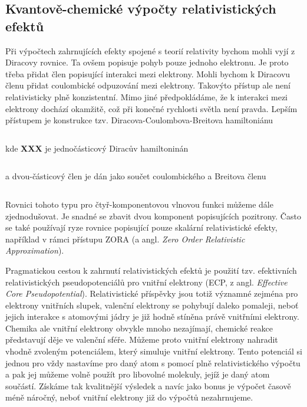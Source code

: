 \subsection{Kvantově-chemické výpočty relativistických efektů}

Při výpočtech zahrnujících efekty spojené s teorií relativity bychom mohli vyjí z Diracovy rovnice. Ta ovšem popisuje pohyb pouze jednoho elektronu. Je proto třeba přidat člen popisující interakci mezi elektrony. Mohli bychom k Diracovu členu přidat coulombické odpuzování mezi elektrony. Takovýto přístup ale není relativisticky plně konzistentní. Mimo jiné předpokládáme, že k interakci mezi elektrony dochází okamžitě, což při konečné rychlosti světla není pravda. Lepším přístupem je konstrukce tzv. Diracova-Coulombova-Breitova hamiltoniánu

\begin{equation}
\label{rov:XXX}
\end{equation}

\noindent kde \textbf{XXX} je jednočásticový Diracův hamiltoninán

\begin{equation}
\label{rov:XXX}
\end{equation}


\noindent a dvou-částicový člen je dán jako součet coulombického a Breitova členu


\begin{equation}
\label{rov:XXX}
\end{equation}

Rovnici tohoto typu pro čtyř-komponentovou vlnovou funkci můžeme dále zjednodušovat. Je snadné se zbavit dvou komponent popisujících pozitrony. Často se také používají ryze rovnice popisující pouze skalární relativistické efekty, například v rámci přístupu ZORA (a angl. \textit{Zero Order Relativistic Approximation}).

Pragmatickou cestou k zahrnutí relativistických efektů je použití tzv. efektivních relativistických pseudopotenciálů pro vnitřní elektrony (ECP, z angl. \textit{Effective Core Pseudopotential}). Relativistické příspěvky jsou totiž významné zejména pro elektrony vnitřních slupek, valenční elektrony se pohybují daleko pomaleji, neboť jejich interakce s atomovými jádry je již hodně stíněna právě vnitřními elektrony. Chemika ale vnitřní elektrony obvykle mnoho nezajímají, chemické reakce představují děje ve valenční sféře. Můžeme proto vnitřní elektrony nahradit vhodně zvoleným potenciálem, který simuluje vnitřní elektrony. Tento potenciál si jednou pro vždy nastavíme pro daný atom s pomocí plně relativistického výpočtu a pak jej můžeme volně použít pro libovolné molekuly, jejíž je daný atom součástí. Získáme tak kvalitnější výsledek a navíc jako bonus je výpočet časově méně náročný, neboť vnitřní elektrony již do výpočtů nezahrnujeme.         
  
